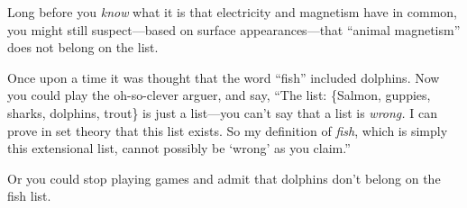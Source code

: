 {{%



{
 Long before you \textit{know} what it is that electricity and
magnetism have in common, you might still suspect---based on surface
appearances---that ``animal
magnetism'' does not belong on the list.}

{
 Once upon a time it was thought that the word
``fish'' included dolphins. Now you
could play the oh-so-clever arguer, and say, ``The
list: \{Salmon, guppies, sharks,
dolphins, trout\} is just a
list---you can't say that a list is \textit{wrong.} I
can prove in set theory that this list exists. So my definition of
\textit{fish}, which is simply this extensional list, cannot possibly
be `wrong' as you
claim.''}

{
 Or you could stop playing games and admit that dolphins
don't belong on the fish list.}

}}
